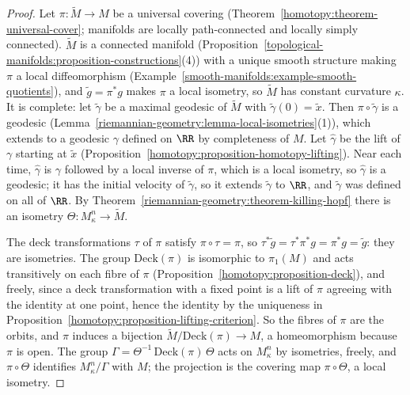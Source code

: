 \begin{proof}
Let $\pi \colon \widetilde{M} \to M$ be a universal covering (Theorem~\ref{homotopy:theorem-universal-cover}; manifolds are locally path-connected and locally simply
connected). $\widetilde{M}$ is a connected manifold (Proposition~\ref{topological-manifolds:proposition-constructions}(4)) with a unique smooth structure making $\pi$ a local
diffeomorphism (Example~\ref{smooth-manifolds:example-smooth-quotients}), and $\tilde g = \pi^*g$ makes $\pi$ a local isometry, so $\widetilde{M}$ has constant curvature
$\kappa$. It is complete: let $\tilde\gamma$ be a maximal geodesic of $\widetilde{M}$ with $\tilde\gamma(0) = \tilde x$. Then $\pi \circ \tilde\gamma$ is a geodesic
(Lemma~\ref{riemannian-geometry:lemma-local-isometries}(1)), which extends to a geodesic $\gamma$ defined on $\RR$ by completeness of $M$. Let $\hat\gamma$ be the lift of
$\gamma$ starting at $\tilde x$ (Proposition~\ref{homotopy:proposition-homotopy-lifting}). Near each time, $\hat\gamma$ is $\gamma$ followed by a local inverse of $\pi$, which is a
local isometry, so $\hat\gamma$ is a geodesic; it has the initial velocity of $\tilde\gamma$, so it extends $\tilde\gamma$ to $\RR$, and $\tilde\gamma$ was defined on all of
$\RR$. By Theorem~\ref{riemannian-geometry:theorem-killing-hopf} there is an isometry $\Theta \colon M^n_\kappa \to \widetilde{M}$.

The deck transformations $\tau$ of $\pi$ satisfy $\pi \circ \tau = \pi$, so $\tau^*\tilde g = \tau^*\pi^*g = \pi^*g = \tilde g$: they are isometries. The group
$\mathrm{Deck}(\pi)$ is isomorphic to $\pi_1(M)$ and acts transitively on each fibre of $\pi$ (Proposition~\ref{homotopy:proposition-deck}), and freely, since a deck
transformation with a fixed point is a lift of $\pi$ agreeing with the identity at one point, hence the identity by the uniqueness in
Proposition~\ref{homotopy:proposition-lifting-criterion}.
So the fibres of $\pi$ are the orbits, and $\pi$ induces a bijection $\widetilde{M}/\mathrm{Deck}(\pi) \to M$, a homeomorphism because $\pi$ is open. The group
$\Gamma = \Theta^{-1}\,\mathrm{Deck}(\pi)\,\Theta$ acts on $M^n_\kappa$ by isometries, freely, and $\pi \circ \Theta$ identifies $M^n_\kappa/\Gamma$ with $M$; the projection is the
covering map $\pi \circ \Theta$, a local isometry.
\end{proof}

